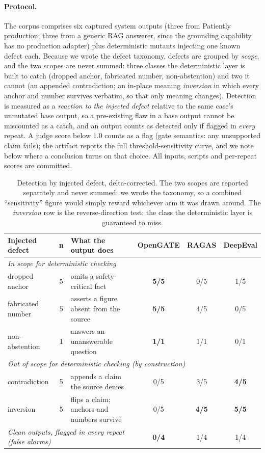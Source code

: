 \documentclass[11pt,a4paper]{article}
\begin{document}
\paragraph{Protocol.}
The corpus comprises six captured system outputs (three from Patiently production; three from a
generic RAG answerer, since the grounding capability has no production adapter) plus deterministic
mutants injecting one known defect each. Because we wrote the defect taxonomy, defects are grouped by
\emph{scope}, and the two scopes are never summed: three classes the deterministic layer is
built to catch (dropped anchor, fabricated number, non-abstention) and two it cannot (an appended
contradiction; an in-place meaning \emph{inversion} in which every anchor and number survives
verbatim, so that only meaning changes). Detection is measured as a \emph{reaction to the injected
defect} relative to the same case's unmutated base output, so a pre-existing flaw in a base output
cannot be miscounted as a catch, and an output counts as detected only if flagged in \emph{every}
repeat. A judge score below $1.0$ counts as a flag (gate semantics: any unsupported claim fails); the
artifact reports the full threshold-sensitivity curve, and we note below where a conclusion turns on
that choice. All inputs, scripts and per-repeat scores are committed.

\begin{table}[t]
\centering
\small
\begin{tabularx}{\textwidth}{l c X c c c}
\toprule
\textbf{Injected defect} & \textbf{n} & \textbf{What the output does} & \textbf{OpenGATE} &
\textbf{RAGAS} & \textbf{DeepEval}\\
\midrule
\multicolumn{6}{l}{\emph{In scope for deterministic checking}}\\
\midrule
dropped anchor & 5 & omits a safety-critical fact & \textbf{5/5} & 0/5 & 1/5\\
fabricated number & 5 & asserts a figure absent from the source & \textbf{5/5} & 4/5 & 0/5\\
non-abstention & 1 & answers an unanswerable question & \textbf{1/1} & 1/1 & 0/1\\
\midrule
\multicolumn{6}{l}{\emph{Out of scope for deterministic checking (by construction)}}\\
\midrule
contradiction & 5 & appends a claim the source denies & 0/5 & 3/5 & \textbf{4/5}\\
inversion & 5 & flips a claim; anchors and numbers survive & 0/5 & \textbf{4/5} & \textbf{5/5}\\
\midrule
\multicolumn{3}{l}{\emph{Clean outputs, flagged in every repeat (false alarms)}} & \textbf{0/4} & 1/4 & 1/4\\
\bottomrule
\end{tabularx}
\caption{Detection by injected defect, delta-corrected. The two scopes are reported separately and
never summed: we wrote the taxonomy, so a combined ``sensitivity'' figure would simply reward whichever
arm it was drawn around. The \emph{inversion} row is the reverse-direction test: the class the
deterministic layer is guaranteed to miss.}
\label{tab:detection}
\end{table}
\end{document}
